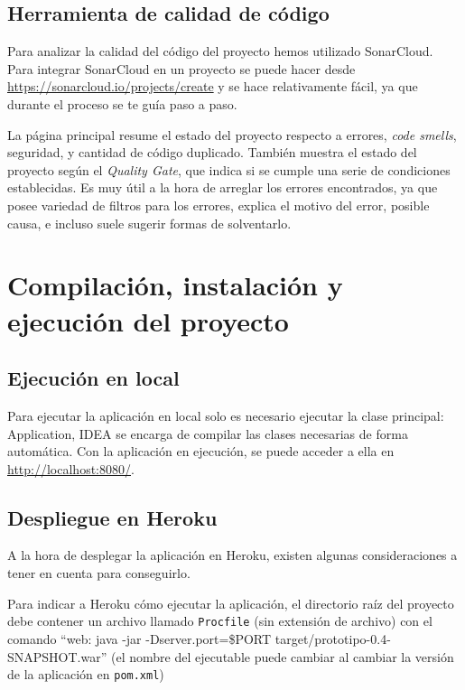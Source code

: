 \subsection{Herramienta de calidad de código}
Para analizar la calidad del código del proyecto hemos utilizado SonarCloud.
Para integrar SonarCloud en un proyecto se puede hacer desde \url{https://sonarcloud.io/projects/create} y se hace relativamente fácil, ya que durante el proceso se te guía paso a paso.

La página principal resume el estado del proyecto respecto a errores, \textit{code smells}, seguridad, y cantidad de código duplicado. También muestra el estado del proyecto según el \textit{Quality Gate}, que indica si se cumple una serie de condiciones establecidas.
Es muy útil a la hora de arreglar los errores encontrados, ya que posee variedad de filtros para los errores, explica el motivo del error, posible causa, e incluso suele sugerir formas de solventarlo.

\section{Compilación, instalación y ejecución del proyecto}
\subsection{Ejecución en local}
Para ejecutar la aplicación en local solo es necesario ejecutar la clase principal: Application, IDEA se encarga de compilar las clases necesarias de forma automática. Con la aplicación en ejecución, se puede acceder a ella en \url{http://localhost:8080/}.
\subsection{Despliegue en Heroku}
A la hora de desplegar la aplicación en Heroku, existen algunas consideraciones a tener en cuenta para conseguirlo.

Para indicar a Heroku cómo ejecutar la aplicación, el directorio raíz del proyecto debe contener un archivo llamado \texttt{Procfile} (sin extensión de archivo) con el comando ``web: java -jar -Dserver.port=\$PORT target/prototipo-0.4-SNAPSHOT.war'' (el nombre del ejecutable puede cambiar al cambiar la versión de la aplicación en \texttt{pom.xml})

